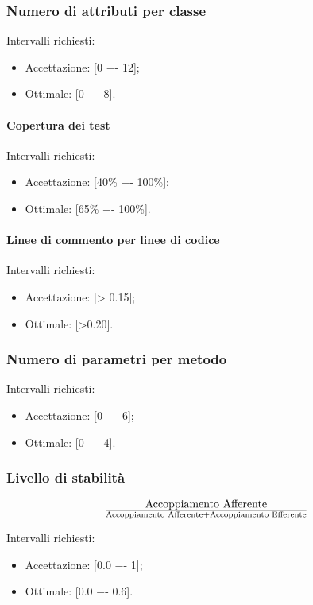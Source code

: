 \subsubsection{Numero di attributi per classe}
Intervalli richiesti:
\begin{itemize}
\item
Accettazione: [0 −- 12];
\item
Ottimale: [0 −- 8].
\end{itemize}

\paragraph{Copertura dei test}
Intervalli richiesti:
\begin{itemize}
\item
Accettazione: [40\% −- 100\%];
\item
Ottimale: [65\% −- 100\%].
\end{itemize}

\paragraph{Linee di commento per linee di codice}
Intervalli richiesti:
\begin{itemize}
\item
Accettazione: [> 0.15];
\item
Ottimale: [>0.20].
\end{itemize}

\subsubsection{Numero di parametri per metodo}
Intervalli richiesti:
\begin{itemize}
\item
Accettazione: [0 −- 6];
\item
Ottimale: [0 −- 4].
\end{itemize}

\subsubsection{Livello di stabilità}

\begin{displaymath}
{\text{Accoppiamento Afferente}}\over{\text{Accoppiamento Afferente} + \text{Accoppiamento Efferente}}
\end{displaymath}

Intervalli richiesti:
\begin{itemize}
\item
Accettazione: [0.0 −- 1];
\item
Ottimale: [0.0 −- 0.6].
\end{itemize}

